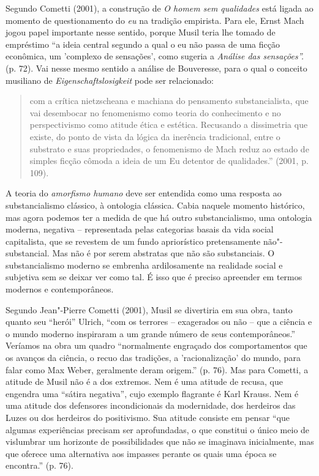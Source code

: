 Segundo Cometti (2001), a construção de \emph{O homem sem qualidades}
está ligada ao momento de questionamento do \emph{eu} na tradição
empirista. Para ele, Ernst Mach jogou papel importante nesse sentido,
porque Musil teria lhe tomado de empréstimo ``a ideia central segundo a
qual o eu não passa de uma ficção econômica, um 'complexo de sensações',
como sugeria a \emph{Análise das sensações''.} (p. 72). Vai nesse mesmo
sentido a análise de Bouveresse, para o qual o conceito musiliano de
\emph{Eigenschaftslosigkeit} pode ser relacionado:

\begin{quote}
com a crítica nietzscheana e machiana do pensamento substancialista, que
vai desembocar no fenomenismo como teoria do conhecimento e no
perspectivismo como atitude ética e estética. Recusando a dissimetria
que existe, do ponto de vista da lógica da inerência tradicional, entre
o substrato e suas propriedades, o fenomenismo de Mach reduz ao estado
de simples ficção cômoda a ideia de um Eu detentor de qualidades.''
(2001, p. 109).
\end{quote}

A teoria do \emph{amorfismo humano} deve ser entendida como uma resposta
ao substancialismo clássico, à ontologia clássica. Cabia naquele momento
histórico, mas agora podemos ter a medida de que há outro
substancialismo, uma ontologia moderna, negativa -- representada pelas
categorias basais da vida social capitalista, que se revestem de um
fundo apriorístico pretensamente não"-substancial. Mas não é por serem
abstratas que não são substanciais. O substancialismo moderno se
embrenha ardilosamente na realidade social e subjetiva sem se deixar ver
como tal. É isso que é preciso apreender em termos modernos e
contemporâneos.

Segundo Jean"-Pierre Cometti (2001), Musil se divertiria em sua obra,
tanto quanto seu ``herói'' Ulrich, ``com os terrores -- exagerados ou
não -- que a ciência e o mundo moderno inspiraram a um grande número de
seus contemporâneos.'' Veríamos na obra um quadro ``normalmente
engraçado dos comportamentos que os avanços da ciência, o recuo das
tradições, a 'racionalização' do mundo, para falar como Max Weber,
geralmente deram origem.'' (p. 76). Mas para Cometti, a atitude de Musil
não é a dos extremos. Nem é uma atitude de recusa, que engendra uma
``sátira negativa'', cujo exemplo flagrante é Karl Krauss. Nem é uma
atitude dos defensores incondicionais da modernidade, dos herdeiros das
Luzes ou dos herdeiros do positivismo. Sua atitude consiste em pensar
``que algumas experiências precisam ser aprofundadas, o que constitui o
único meio de vislumbrar um horizonte de possibilidades que não se
imaginava inicialmente, mas que oferece uma alternativa aos impasses
perante os quais uma época se encontra.'' (p. 76).

